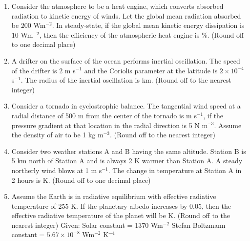\documentclass[a4paper,10pt]{article}
\begin{document}
\begin{enumerate}
\item Consider the atmosphere to be a heat engine, which converts absorbed radiation to kinetic energy of winds. Let the global mean radiation absorbed be 200 Wm$^{-2}$. In steady-state, if the global mean kinetic energy dissipation is 10 Wm$^{-2}$, then the efficiency of the atmospheric heat engine is \underline{\hspace{2cm}} \%. (Round off to one decimal place)

\hfill{}

\item A drifter on the surface of the ocean performs inertial oscillation. The speed of the drifter is 2 m s$^{-1}$ and the Coriolis parameter at the latitude is $2 \times 10^{-4}$ s$^{-1}$. The radius of the inertial oscillation is \underline{\hspace{2cm}} km. (Round off to the nearest integer)

\hfill{}

\item Consider a tornado in cyclostrophic balance. The tangential wind speed at a radial distance of 500 m from the center of the tornado is \underline{\hspace{2cm}} m s$^{-1}$, if the pressure gradient at that location in the radial direction is 5 N m$^{-3}$. Assume the density of air to be 1 kg m$^{-3}$. (Round off to the nearest integer)

\hfill{}

\item Consider two weather stations A and B having the same altitude. Station B is 5 km north of Station A and is always 2 K warmer than Station A. A steady northerly wind blows at 1 m s$^{-1}$. The change in temperature at Station A in 2 hours is \underline{\hspace{2cm}} K. (Round off to one decimal place)

\hfill{}

\item Assume the Earth is in radiative equilibrium with effective radiative temperature of 255 K. If the planetary albedo increases by 0.05, then the effective radiative temperature of the planet will be \underline{\hspace{2cm}} K. (Round off to the nearest integer)
Given:
Solar constant = 1370 Wm$^{-2}$
Stefan Boltzmann constant = $5.67 \times 10^{-8}$ Wm$^{-2}$ K$^{-4}$

\hfill{}

\end{enumerate}
\end{document}
